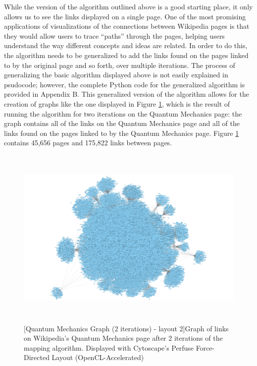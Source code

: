 \documentclass[man, 12pt, floatsintext, donotrepeattitle]{apa6}
\begin{document}
While the version of the algorithm outlined above is a good starting place, it
only allows us to see the links displayed on a single page.  One of the most promising
applications of visualizations of the connections between Wikipedia pages is that they would allow
users to trace ``paths'' through the pages, helping users understand the way
different concepts and ideas are related.  In order to do this, the algorithm
needs to be generalized to add the links found on the pages linked to by the original page and so
forth, over multiple iterations.  The process of generalizing the basic
algorithm displayed above is not easily explained in psudocode; however, the complete
Python code for the generalized algorithm is provided in Appendix B.  This
generalized version of the algorithm allows for the creation of graphs like the
one displayed in Figure \ref{fig:QuantumMechanics_v_45656_e_175822_b}, which is the result of running the algorithm
for two iterations on the Quantum Mechanics page: the graph contains all of the
links on the Quantum Mechanics page and all of the links found on the pages
linked to by the Quantum Mechanics page.  Figure \ref{fig:QuantumMechanics_v_45656_e_175822_b} contains 45,656 pages and
175,822 links between pages.
\begin{figure}[]
  \centering
    \includegraphics[width=6in, height=3.5in]{Resources/nolimit/2iterations/QuantumMechanics_v_45656_e_175822_nolimit_b.png}
  [Quantum Mechanics Graph (2 iterations) - layout 2]{Graph of links on Wikipedia's Quantum Mechanics page after 2
  iterations of the mapping algorithm.  Displayed with Cytoscape's Perfuse Force-Directed Layout (OpenCL-Accelerated)
    \label{fig:QuantumMechanics_v_45656_e_175822_b}}
\end{figure}
\end{document}
